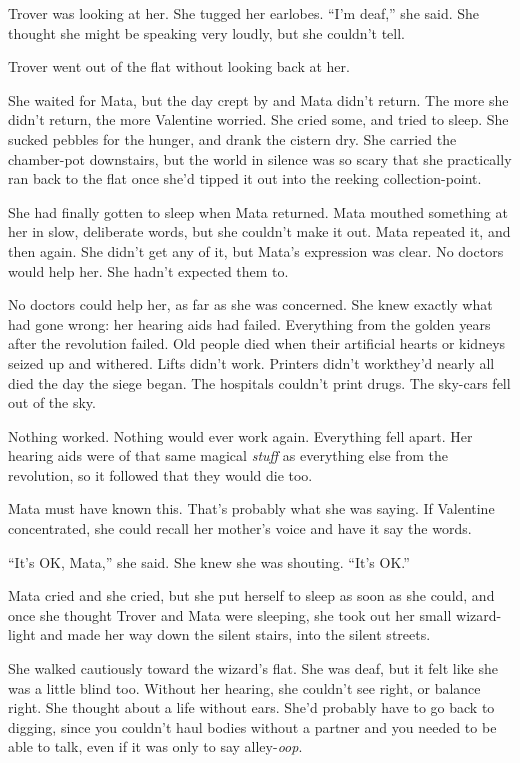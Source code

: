 Trover was looking at her. She tugged her earlobes. “I’m deaf,” she
said. She thought she might be speaking very loudly, but she
couldn’t tell.

Trover went out of the flat without looking back at her.

She waited for Mata, but the day crept by and Mata didn’t return.
The more she didn’t return, the more Valentine worried. She cried
some, and tried to sleep. She sucked pebbles for the hunger, and
drank the cistern dry. She carried the chamber-pot downstairs, but
the world in silence was so scary that she practically ran back to
the flat once she’d tipped it out into the reeking
collection-point.

She had finally gotten to sleep when Mata returned. Mata mouthed
something at her in slow, deliberate words, but she couldn’t make
it out. Mata repeated it, and then again. She didn’t get any of it,
but Mata’s expression was clear. No doctors would help her. She
hadn’t expected them to.

No doctors could help her, as far as she was concerned. She knew
exactly what had gone wrong: her hearing aids had failed.
Everything from the golden years after the revolution failed. Old
people died when their artificial hearts or kidneys seized up and
withered. Lifts didn’t work. Printers didn’t work\dash{}they’d nearly all
died the day the siege began. The hospitals couldn’t print drugs.
The sky-cars fell out of the sky.

Nothing worked. Nothing would ever work again. Everything fell
apart. Her hearing aids were of that same magical \emph{stuff} as
everything else from the revolution, so it followed that they would
die too.

Mata must have known this. That’s probably what she was saying. If
Valentine concentrated, she could recall her mother’s voice and
have it say the words.

“It’s OK, Mata,” she said. She knew she was shouting. “It’s OK.”

Mata cried and she cried, but she put herself to sleep as soon as
she could, and once she thought Trover and Mata were sleeping, she
took out her small wizard-light and made her way down the silent
stairs, into the silent streets.

She walked cautiously toward the wizard’s flat. She was deaf, but
it felt like she was a little blind too. Without her hearing, she
couldn’t see right, or balance right. She thought about a life
without ears. She’d probably have to go back to digging, since you
couldn’t haul bodies without a partner and you needed to be able to
talk, even if it was only to say alley-\emph{oop}.

